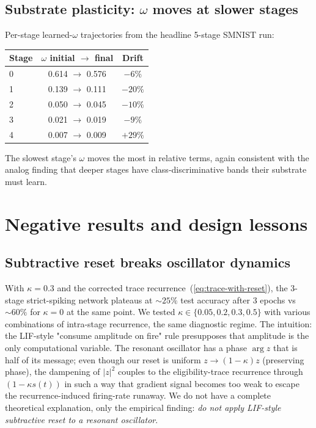 \documentclass[11pt]{article}
\begin{document}
\subsection{Substrate plasticity: $\omega$ moves at slower stages}

Per-stage learned-$\omega$ trajectories from the headline 5-stage
SMNIST run:
\begin{center}
\begin{tabular}{@{}lcc@{}}
\toprule
Stage & $\omega$ initial $\to$ final & Drift \\
\midrule
0 & 0.614 $\to$ 0.576 & $-6\%$ \\
1 & 0.139 $\to$ 0.111 & $-20\%$ \\
2 & 0.050 $\to$ 0.045 & $-10\%$ \\
3 & 0.021 $\to$ 0.019 & $-9\%$  \\
4 & 0.007 $\to$ 0.009 & $+29\%$ \\
\bottomrule
\end{tabular}
\end{center}
The slowest stage's $\omega$ moves the most in relative terms, again
consistent with the analog finding that deeper stages have
class-discriminative bands their substrate must learn.

\section{Negative results and design lessons}\label{sec:negative-results}

\subsection{Subtractive reset breaks oscillator dynamics}

With $\kappa = 0.3$ and the corrected trace
recurrence~(\ref{eq:trace-with-reset}), the 3-stage strict-spiking
network plateaus at $\sim 25\%$ test accuracy after 3 epochs vs
$\sim 60\%$ for $\kappa = 0$ at the same point. We tested
$\kappa \in \{0.05, 0.2, 0.3, 0.5\}$ with various combinations of
intra-stage recurrence, the same diagnostic regime. The
intuition: the LIF-style "consume amplitude on fire" rule presupposes
that amplitude is the only computational variable. The resonant
oscillator has a phase $\arg z$ that is half of its message; even
though our reset is uniform $z \to (1-\kappa)z$ (preserving phase),
the dampening of $|z|^2$ couples to the eligibility-trace recurrence
through $(1 - \kappa s(t))$ in such a way that gradient signal becomes
too weak to escape the recurrence-induced firing-rate runaway. We do
not have a complete theoretical explanation, only the empirical
finding: \emph{do not apply LIF-style subtractive reset to a resonant
oscillator}.
\end{document}
